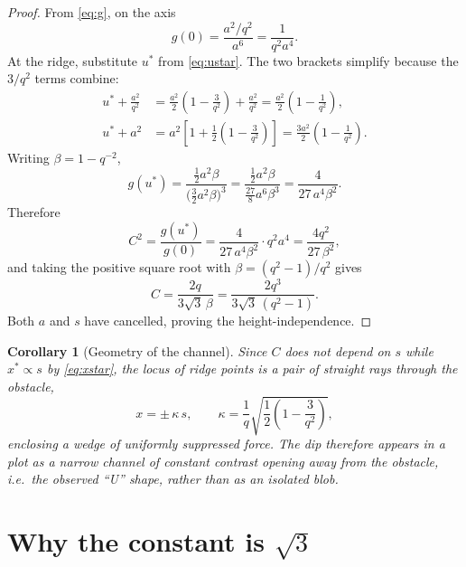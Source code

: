 \documentclass[11pt]{article}
\newtheorem{corollary}[theorem]{Corollary}
\begin{document}
\begin{proof}
From \eqref{eq:g}, on the axis
\begin{equation}
  g(0)=\frac{a^{2}/q^{2}}{a^{6}}=\frac{1}{q^{2}a^{4}} .
\end{equation}
At the ridge, substitute $u^{*}$ from \eqref{eq:ustar}. The two brackets
simplify because the $3/q^{2}$ terms combine:
\begin{align}
  u^{*}+\frac{a^{2}}{q^{2}}
  &=\frac{a^{2}}{2}\left(1-\frac{3}{q^{2}}\right)+\frac{a^{2}}{q^{2}}
   =\frac{a^{2}}{2}\left(1-\frac{1}{q^{2}}\right), \\[4pt]
  u^{*}+a^{2}
  &=a^{2}\left[1+\frac{1}{2}\left(1-\frac{3}{q^{2}}\right)\right]
   =\frac{3a^{2}}{2}\left(1-\frac{1}{q^{2}}\right).
\end{align}
Writing $\beta=1-q^{-2}$,
\begin{equation}
  g(u^{*})
  =\frac{\tfrac{1}{2}a^{2}\beta}{\bigl(\tfrac{3}{2}a^{2}\beta\bigr)^{3}}
  =\frac{\tfrac{1}{2}a^{2}\beta}{\tfrac{27}{8}a^{6}\beta^{3}}
  =\frac{4}{27\,a^{4}\beta^{2}} .
\end{equation}
Therefore
\begin{equation}
  C^{2}=\frac{g(u^{*})}{g(0)}
  =\frac{4}{27\,a^{4}\beta^{2}}\cdot q^{2}a^{4}
  =\frac{4q^{2}}{27\,\beta^{2}} ,
\end{equation}
and taking the positive square root with $\beta=(q^{2}-1)/q^{2}$ gives
\begin{equation}
  C=\frac{2q}{3\sqrt3\,\beta}=\frac{2q^{3}}{3\sqrt3\,(q^{2}-1)} .
\end{equation}
Both $a$ and $s$ have cancelled, proving the height-independence.
\end{proof}

\begin{corollary}[Geometry of the channel]
Since $C$ does not depend on $s$ while $x^{*}\propto s$ by \eqref{eq:xstar},
the locus of ridge points is a pair of straight rays through the obstacle,
\begin{equation}
  x=\pm\,\kappa\,s,
  \qquad
  \kappa=\frac{1}{q}\sqrt{\frac{1}{2}\left(1-\frac{3}{q^{2}}\right)} ,
\end{equation}
enclosing a wedge of uniformly suppressed force. The dip therefore appears in
a plot as a narrow channel of constant contrast opening away from the
obstacle, i.e.\ the observed ``U'' shape, rather than as an isolated blob.
\end{corollary}

\section{Why the constant is \texorpdfstring{$\sqrt{3}$}{sqrt(3)}}
\end{document}
